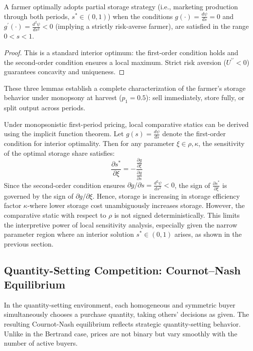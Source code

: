 \begin{lemma}
    A farmer optimally adopts partial storage strategy (i.e., marketing production through both periods, $s^*\in (0,1)$) when the conditions $g(\cdot)  =  \frac{d \psi}{d s} = 0$ and $g^\prime(\cdot) = \frac{d^2 \psi}{d s^2} < 0 $ (implying a strictly risk-averse farmer), are satisfied in the range $0<s<1$.
    \label{lemma: Bertrand Interior solution}
\end{lemma}
\begin{proof}
    This is a standard interior optimum: the first-order condition holds and the second-order condition ensures a local maximum. Strict risk aversion ($U^{\prime\prime} < 0$) guarantees concavity and uniqueness.
\end{proof}

These three lemmas establish a complete characterization of the farmer's storage behavior under monopsony at harvest ($p_1 = 0.5$): sell immediately, store fully, or split output across periods.  

Under monopsonistic first-period pricing, local comparative statics can be derived using the implicit function theorem. Let $g(s) = \frac{d\psi}{ds}$ denote the first-order condition for interior optimality. Then for any parameter $\xi \in {\rho, \kappa}$, the sensitivity of the optimal storage share satisfies:
$$
\frac{\partial s^*}{\partial \xi}= -\frac{\frac{\partial g}{\partial \xi}}{\frac{\partial g}{\partial s}}
$$
Since the second-order condition ensures $\partial g / \partial s = \frac{d^2\psi}{ds^2} < 0$, the sign of $\frac{\partial s^*}{\partial \xi}$ is governed by the sign of $\partial g / \partial \xi$. Hence, storage is increasing in storage efficiency factor $\kappa$-where lower storage cost unambiguously increases storage. However, the comparative static with respect to $\rho$ is not signed deterministically. This limits the interpretive power of local sensitivity analysis, especially given the narrow parameter region where an interior solution $s^* \in (0,1)$ arises, as shown in the previous section.







\subsection{Quantity-Setting Competition: Cournot--Nash Equilibrium}
\noindent In the quantity-setting environment, each homogeneous and symmetric buyer simultaneously chooses a purchase quantity, taking others' decisions as given. The resulting Cournot-Nash equilibrium reflects strategic quantity-setting behavior. Unlike in the Bertrand case, prices are not binary but vary smoothly with the number of active buyers.

